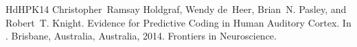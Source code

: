 \documentclass[letterpaper,10pt,english]{jupyterBook}
\begin{document}
\begin{sphinxthebibliography}{HdHPK14}
\sphinxAtStartPar
Christopher Ramsay Holdgraf, Wendy de Heer, Brian N. Pasley, and Robert T. Knight. Evidence for Predictive Coding in Human Auditory Cortex. In . Brisbane, Australia, Australia, 2014. Frontiers in Neuroscience.
\end{sphinxthebibliography}







\renewcommand{\indexname}{Index}
\printindex
\end{document}
